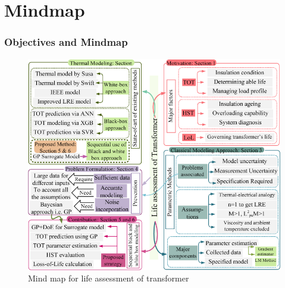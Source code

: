 \documentclass[10pt,hyperref={pdfpagelabels=false}]{beamer}
\begin{document}
\section{Mindmap}
\begin{frame}[fragile]
\frametitle{Objectives and Mindmap}
\begin{figure}
    \centering
    \includegraphics[scale=0.31]{Mindmap_APS_R1.png}
    \caption{Mind map for life assessment of transformer}
\end{figure}

\end{frame}

\end{document}
